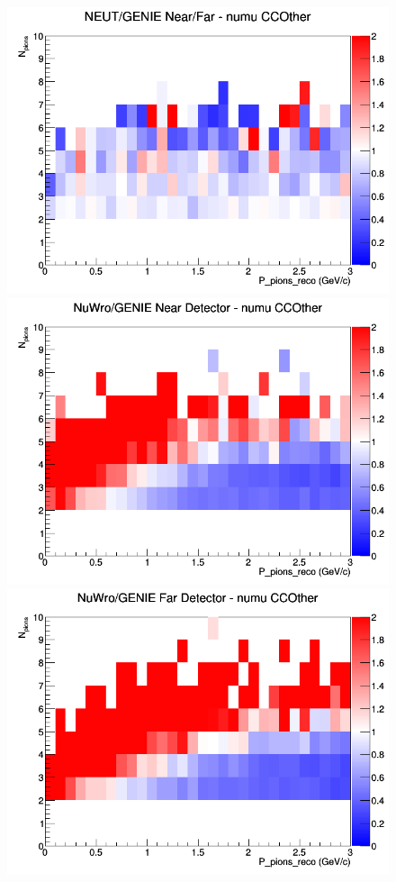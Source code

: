 \documentclass[12pt]{article}
\begin{document}
\begin{figure}[h]
\endminipage
{}
\includegraphics[width=\linewidth]{eff_N_P/GAr/pions/ratios/CCOther_NEUT_GENIE_numu_NF_N_P.png}
\endminipage
\newline
{}
\includegraphics[width=\linewidth]{eff_N_P/GAr/pions/ratios/CCOther_NuWro_GENIE_numu_near_N_P.png}
\endminipage
{}
\includegraphics[width=\linewidth]{eff_N_P/GAr/pions/ratios/CCOther_NuWro_GENIE_numu_far_N_P.png}

\end{figure}
\end{document}
